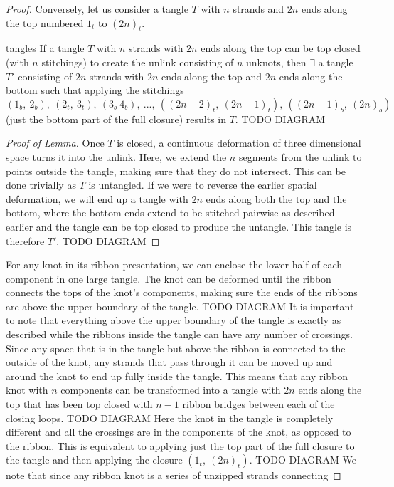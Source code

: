 \begin{paper}
\begin{proof}
Conversely, let us consider a tangle $T$ with $n$ strands and $2n$ ends along
the top numbered $1_t$ to $(2n)_t$.
\begin{paperlemma}{tangles}
If a tangle $T$ with $n$ strands with $2n$ ends along the top can be top closed
(with $n$ stitchings) to create the unlink consisting of $n$ unknots, then
$\exists$ a tangle $T'$ consisting of $2n$ strands with $2n$ ends along the top
and $2n$ ends along the bottom such that applying the stitchings$(1_b,~2_b),~
(2_t,~3_t),~(3_b~4_b),~...,~((2n-2)_t,~(2n-1)_t),~((2n-1)_b,~(2n)_b)$ (just the
bottom part of the full closure) results in $T$. TODO DIAGRAM
\end{paperlemma}
\begin{proof}[Proof of Lemma]
Once $T$ is closed, a continuous deformation of three dimensional space turns it
into the unlink.
Here, we extend the $n$ segments from the unlink to points outside the tangle,
making sure that they do not intersect.
This can be done trivially as $T$ is untangled.
If we were to reverse the earlier spatial deformation, we will end up a tangle
with $2n$ ends along both the top and the bottom, where the bottom ends extend
to be stitched pairwise as described earlier and the tangle can be top closed to
produce the untangle.
This tangle is therefore $T'$.
TODO DIAGRAM
\end{proof}
For any knot in its ribbon presentation, we can enclose the lower half of each
component in one large tangle.
The knot can be deformed until the ribbon connects the tops of the knot's
components, making sure the ends of the ribbons are above the upper boundary of
the tangle.
TODO DIAGRAM
It is important to note that everything above the upper boundary of the tangle
is exactly as described while the ribbons inside the tangle can have any number
of crossings.
Since any space that is in the tangle but above the ribbon is connected to the
outside of the knot, any strands that pass through it can be moved up and around
the knot to end up fully inside the tangle.
This means that any ribbon knot with $n$ components can be transformed into a
tangle with $2n$ ends along the top that has been top closed with $n-1$ ribbon
bridges between each of the closing loops.
TODO DIAGRAM
Here the knot in the tangle is completely different and all the crossings are in
the components of the knot, as opposed to the ribbon.
This is equivalent to applying just the top part of the full closure to the
tangle and then applying the closure $(1_t,~(2n)_t)$.
TODO DIAGRAM
We note that since any ribbon knot is a series of unzipped strands connecting

\end{proof}
\end{paper}
